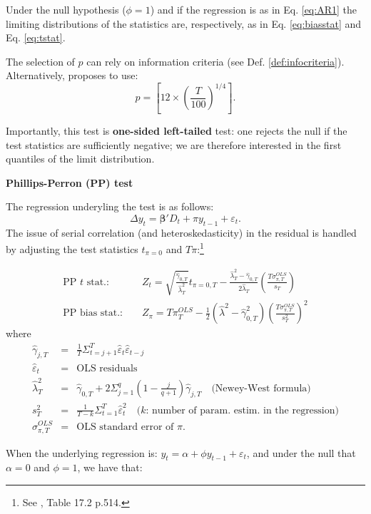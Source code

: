\documentclass[
  11pt,
]{book}
\theoremstyle{definition}
\theoremstyle{definition}
\theoremstyle{definition}
\theoremstyle{definition}
\theoremstyle{remark}
\begin{document}
Under the null hypothesis (\(\phi=1\)) and if the regression is as in Eq. \eqref{eq:AR1} the limiting distributions of the statistics are, respectively, as in Eq. \eqref{eq:biasstat} and Eq. \eqref{eq:tstat}.

The selection of \(p\) can rely on information criteria (see Def. \ref{def:infocriteria}). Alternatively, \citet{Schwert_1989} proposes to use:
\[
p=\left[12 \times \left( \frac{T}{100} \right)^{1/4}\right].
\]

Importantly, this test is \textbf{one-sided left-tailed} test: one rejects the null if the test statistics are sufficiently negative; we are therefore interested in the first quantiles of the limit distribution.

\textbf{Phillips-Perron (PP) test}

The regression underyling the \citet{Phillips_Perron_1988} test is as follows:
\[
\Delta y_t = \boldsymbol\beta' D_t + \pi y_{t-1} + \varepsilon_t.
\]
The issue of serial correlation (and heteroskedasticity) in the residual is handled by adjusting the test statistics \(t_{\pi=0}\) and \(T\pi\):\footnote{See \citet{Hamilton_1994}, Table 17.2 p.514.}

\begin{eqnarray*}
\mbox{PP $t$ stat.: } && Z_t = \sqrt{\frac{\hat\gamma_{0,T}}{\hat\lambda_T^2}} t_{\pi=0,T} - \frac{\hat\lambda_T^2-\hat\gamma_{0,T}}{2\hat\lambda_T}\left(\frac{T\sigma^{OLS}_{\pi,T}}{s_T}\right)\\
\mbox{PP bias stat.: } && Z_\pi = T\pi^{OLS}_T - \frac{1}{2}(\hat\lambda^2-\hat\gamma_{0,T}^2)\left(\frac{T \sigma^{OLS}_{\pi,T}}{s^2_T}\right)^2
\end{eqnarray*}
where
\begin{eqnarray*}
\hat\gamma_{j,T} &=& \frac{1}{T}\Sigma_{t=j+1}^{T}\hat{\varepsilon}_t\hat{\varepsilon}_{t-j}\\
\hat{\varepsilon}_t &=& \mbox{OLS residuals}\\
\hat\lambda_T^2 &=& \hat\gamma_{0,T} + 2 \Sigma_{j=1}^{q}\left(1-\frac{j}{q+1}\right) \hat\gamma_{j,T} \quad \mbox{(Newey-West formula)}\\
s_T^2 &=& \frac{1}{T-k} \Sigma_{t=1}^{T} \hat{\varepsilon}^2_t \quad \mbox{($k$: number of param. estim. in the regression)}\\
\sigma^{OLS}_{\pi,T} &=& \mbox{OLS standard error of $\pi$}.
\end{eqnarray*}

When the underlying regression is: \(y_t = \alpha + \phi y_{t-1} + \varepsilon_t\), and under the null that \(\alpha=0\) and \(\phi=1\), we have that:
\end{document}
